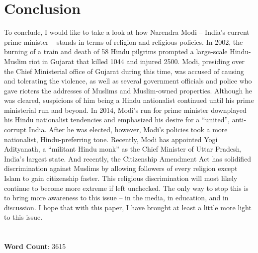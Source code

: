 \documentclass[11pt, letterpaper]{article}
\begin{document}
\section{Conclusion}\label{conclusion}

To conclude, I would like to take a look at how Narendra Modi -- India's
current prime minister -- stands in terms of religion and religious
policies. In 2002, the burning of a train and death of 58 Hindu pilgrims
prompted a large-scale Hindu-Muslim riot in Gujarat that killed 1044 and
injured 2500. Modi, presiding over the Chief Ministerial office of
Gujarat during this time, was accused of causing and tolerating the
violence, as well as several government officials and police who gave
rioters the addresses of Muslims and Muslim-owned properties. Although
he was cleared, suspicions of him being a Hindu nationalist continued
until his prime ministerial run and beyond. In 2014, Modi's run for
prime minister downplayed his Hindu nationalist tendencies and
emphasized his desire for a ``united'', anti-corrupt India. After he was
elected, however, Modi's policies took a more nationalist,
Hindu-preferring tone. Recently, Modi has appointed Yogi Adityanath, a
``militant Hindu monk'' \cite{nyt} as the Chief Minister of Uttar
Pradesh, India's largest state. And recently, the Citizenship Amendment
Act has solidified discrimination against Muslims by allowing followers
of every religion except Islam to gain citizenship faster. This
religious discrimination will most likely continue to become more
extreme if left unchecked. The only way to stop this is to bring more
awareness to this issue -- in the media, in education, and in
discussion. I hope that with this paper, I have brought at least a
little more light to this issue.
\\ \\ \\ 
\textbf{Word Count}: 3615
\newpage
\end{document}
